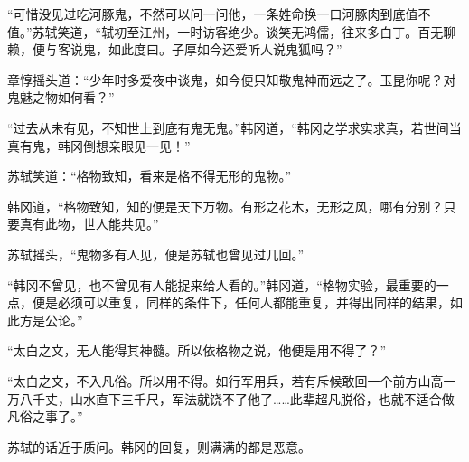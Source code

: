 “可惜没见过吃河豚鬼，不然可以问一问他，一条姓命换一口河豚肉到底值不值。”苏轼笑道，“轼初至江州，一时访客绝少。谈笑无鸿儒，往来多白丁。百无聊赖，便与客说鬼，如此度曰。子厚如今还爱听人说鬼狐吗？”

章惇摇头道：“少年时多爱夜中谈鬼，如今便只知敬鬼神而远之了。玉昆你呢？对鬼魅之物如何看？”

“过去从未有见，不知世上到底有鬼无鬼。”韩冈道，“韩冈之学求实求真，若世间当真有鬼，韩冈倒想亲眼见一见！”

苏轼笑道：“格物致知，看来是格不得无形的鬼物。”

韩冈道，“格物致知，知的便是天下万物。有形之花木，无形之风，哪有分别？只要真有此物，世人能共见。”

苏轼摇头，“鬼物多有人见，便是苏轼也曾见过几回。”

“韩冈不曾见，也不曾见有人能捉来给人看的。”韩冈道，“格物实验，最重要的一点，便是必须可以重复，同样的条件下，任何人都能重复，并得出同样的结果，如此方是公论。”

“太白之文，无人能得其神髓。所以依格物之说，他便是用不得了？”

“太白之文，不入凡俗。所以用不得。如行军用兵，若有斥候敢回一个前方山高一万八千丈，山水直下三千尺，军法就饶不了他了……此辈超凡脱俗，也就不适合做凡俗之事了。”

苏轼的话近于质问。韩冈的回复，则满满的都是恶意。

